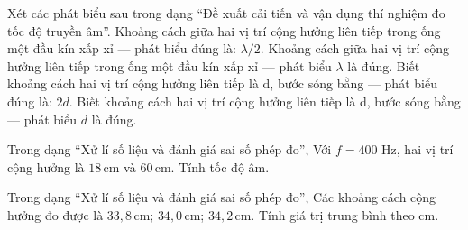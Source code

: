 \begin{ex}
Xét các phát biểu sau trong dạng “Đề xuất cải tiến và vận dụng thí nghiệm đo tốc độ truyền âm”.
\choiceTF
{\True Khoảng cách giữa hai vị trí cộng hưởng liên tiếp trong ống một đầu kín xấp xỉ — phát biểu đúng là: $\lambda/2$.}
{Khoảng cách giữa hai vị trí cộng hưởng liên tiếp trong ống một đầu kín xấp xỉ — phát biểu $\lambda$ là đúng.}
{\True Biết khoảng cách hai vị trí cộng hưởng liên tiếp là d, bước sóng bằng — phát biểu đúng là: $2d$.}
{Biết khoảng cách hai vị trí cộng hưởng liên tiếp là d, bước sóng bằng — phát biểu $d$ là đúng.}
\end{ex}

\begin{ex}
Trong dạng “Xử lí số liệu và đánh giá sai số phép đo”, Với $f=400$ Hz, hai vị trí cộng hưởng là $18\,\text{cm}$ và $60\,\text{cm}$. Tính tốc độ âm.
\choiceTF

\end{ex}

\begin{ex}
Trong dạng “Xử lí số liệu và đánh giá sai số phép đo”, Các khoảng cách cộng hưởng đo được là $33,8\,\text{cm}$; $34,0\,\text{cm}$; $34,2\,\text{cm}$. Tính giá trị trung bình theo cm.
\end{ex}

